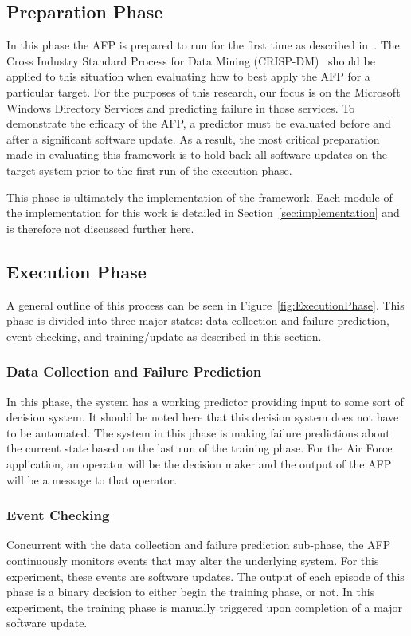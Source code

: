 \subsection{Preparation Phase}
In this phase the AFP is prepared to run for the first time as described
in~\cite{irrera2015}.  The Cross Industry Standard Process for Data Mining
(CRISP-DM)~\cite{crispdm} should be applied to this situation when evaluating
how to best apply the AFP for a particular target.  For the purposes of this
research, our focus is on the Microsoft Windows Directory Services and
predicting failure in those services.  To demonstrate the efficacy of the AFP,
a predictor must be evaluated before and after a significant software update.
As a result, the most critical preparation made in evaluating this framework is
to hold back all software updates on the target system prior to the first run
of the execution phase.  

This phase is ultimately the implementation of the framework.  Each module of
the implementation for this work is detailed in
Section~\ref{sec:implementation} and is therefore not discussed further here.  

\subsection{Execution Phase}
A general outline of this process can be seen in
Figure~\ref{fig:ExecutionPhase}.  This phase is divided into three major
states: data collection and failure prediction, event checking, and
training/update as described in this section.

\figExecutionPhase

\subsubsection{Data Collection and Failure Prediction}
In this phase, the system has a working predictor providing input to some sort
of decision system.  It should be noted here that this decision system does not
have to be automated.  The system in this phase is making failure predictions
about the current state based on the last run of the training phase.  For the
Air Force application, an operator will be the decision maker and the output of
the AFP will be a message to that operator.  

\subsubsection{Event Checking}
Concurrent with the data collection and failure prediction sub-phase, the AFP
continuously monitors events that may alter the underlying system.  For this
experiment, these events are software updates.  The output of each episode of
this phase is a binary decision to either begin the training phase, or not.  In
this experiment, the training phase is manually triggered upon completion of a
major software update.

